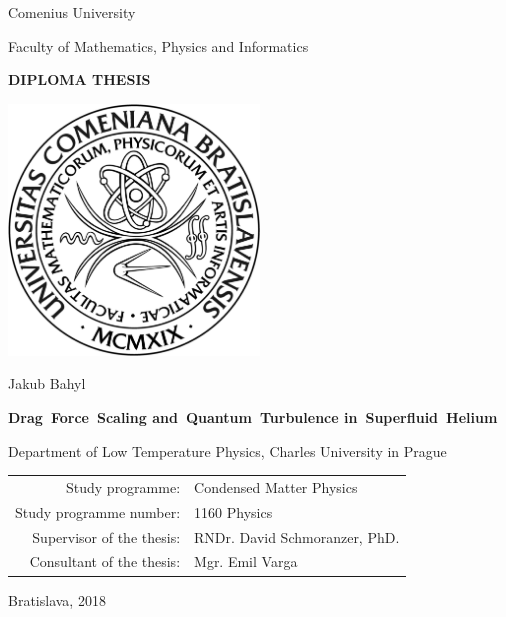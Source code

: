 \begin{center}
	\large\sf
	Comenius University

	Faculty of Mathematics, Physics and Informatics

	\bigskip

	{
		\Large \bfseries \sffamily
		DIPLOMA THESIS
	}

	\vspace*{10mm}

	\includegraphics[width=0.5\textwidth]{graphics/fmfi_logo.jpg}

	\vfill
	\vspace*{5mm}

	{
		\LARGE\sf
		Jakub Bahyl
	}

	\vspace*{5mm}

	{
		\LARGE \bfseries \sffamily
		\mbox{Drag Force Scaling}
		\mbox{and Quantum Turbulence}
		\mbox{in Superfluid Helium}
	}

	\vfill

	Department of Low Temperature Physics, Charles University in Prague

	\vfill

	\begin{tabular}{rl}

	Study programme: & Condensed Matter Physics \\
	\noalign{\vspace{1mm}}
	Study programme number: & 1160 Physics \\
	\noalign{\vspace{1mm}}
	Supervisor of the thesis: & RNDr. David Schmoranzer, PhD. \\
	\noalign{\vspace{1mm}}
	Consultant of the thesis: & Mgr. Emil Varga \\

	\end{tabular}

	\vfill

	{
		\Large\sf Bratislava, 2018
	}

\end{center}

\newpage
